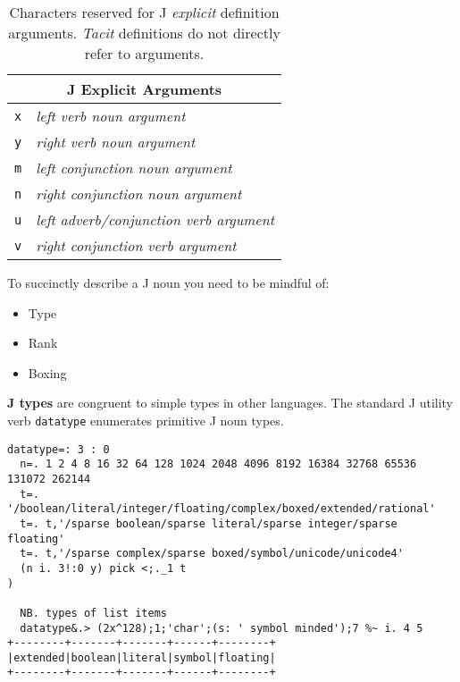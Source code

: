 \begin{table}[htbp]
  \centering
   \scriptsize
\begin{tabular}{|l|l|} \hline
   \multicolumn{2}{|c|}{\textbf{\normalsize J Explicit Arguments\T\B}} \\ \hline
   \texttt{x\T\B} & \textcolor{CodeComment}{\ttfamily\textsl{left verb noun argument}}  \\
   \texttt{y\T\B} & \textcolor{CodeComment}{\ttfamily\textsl{right verb noun argument}} \\ 
   \texttt{m\T\B} & \textcolor{CodeComment}{\ttfamily\textsl{left conjunction noun argument}} \\ 
   \texttt{n\T\B} & \textcolor{CodeComment}{\ttfamily\textsl{right conjunction noun argument}} \\ 
   \texttt{u\T\B} & \textcolor{CodeComment}{\ttfamily\textsl{left adverb/conjunction verb argument}} \\ 
   \texttt{v\T\B} & \textcolor{CodeComment}{\ttfamily\textsl{right conjunction verb argument}}  \\ \hline
\end{tabular}
   \caption[J Arguments]{Characters reserved for J \emph{explicit} definition arguments. \emph{Tacit} definitions do
   not directly refer to arguments.}
   \label{tab:jargs}
\end{table}

To succinctly describe a J noun you need to be mindful of:
\begin{itemize}
	\item Type
	\item Rank
	\item Boxing
\end{itemize}

\textbf{J types} are congruent to simple types in other languages.  The standard J utility verb \texttt{datatype} enumerates primitive J noun types.

\begin{lstlisting}[frame=single,framerule=0pt,basicstyle=\ttfamily\footnotesize] 
datatype=: 3 : 0
  n=. 1 2 4 8 16 32 64 128 1024 2048 4096 8192 16384 32768 65536 131072 262144
  t=. '/boolean/literal/integer/floating/complex/boxed/extended/rational'
  t=. t,'/sparse boolean/sparse literal/sparse integer/sparse floating'
  t=. t,'/sparse complex/sparse boxed/symbol/unicode/unicode4'
  (n i. 3!:0 y) pick <;._1 t
)

  NB. types of list items
  datatype&.> (2x^128);1;'char';(s: ' symbol minded');7 %~ i. 4 5
+--------+-------+-------+------+--------+
|extended|boolean|literal|symbol|floating|
+--------+-------+-------+------+--------+
\end{lstlisting}  

